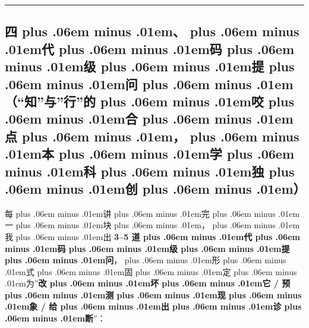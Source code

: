 \documentclass[
]{article}
\def\zh#1{{\zhfont #1}}
\def\zhglue{\hskip0pt plus .06em minus .01em}
\begin{document}
\begin{center}\rule{0.5\linewidth}{0.5pt}\end{center}

\subsection{\zh{四\zhglue 、\zhglue 代\zhglue 码\zhglue 级\zhglue 提\zhglue 问\zhglue （}``\zh{知}''\zh{与}''\zh{行}''\zh{的\zhglue 咬\zhglue 合\zhglue 点\zhglue ，\zhglue 本\zhglue 学\zhglue 科\zhglue 独\zhglue 创\zhglue ）}}\label{ux56dbux4ee3ux7801ux7ea7ux63d0ux95eeux77e5ux4e0eux884cux7684ux54acux5408ux70b9ux672cux5b66ux79d1ux72ecux521b}

\zh{每\zhglue 讲\zhglue 完\zhglue 一\zhglue 块\zhglue ，\zhglue 我\zhglue 出} \textbf{3--5 \zh{道\zhglue 代\zhglue 码\zhglue 级\zhglue 提\zhglue 问}}\zh{，\zhglue 形\zhglue 式\zhglue 固\zhglue 定\zhglue 为}''\textbf{\zh{改\zhglue 坏\zhglue 它} / \zh{预\zhglue 测\zhglue 现\zhglue 象} / \zh{给\zhglue 出\zhglue 诊\zhglue 断}}''\zh{：}
\end{document}
